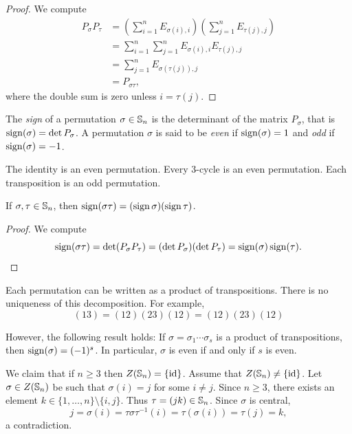 \begin{proof}
We compute 
\begin{align*}
P_\sigma P_\tau &=\left(\sum_{i=1}^n E_{\sigma(i),i}\right)\left(\sum_{j=1}^nE_{\tau{(j)},j}\right)\\
&=\sum_{i=1}^n\sum_{j=1}^n E_{\sigma(i),i}E_{\tau(j),j}\\
&=\sum_{j=1}^n E_{\sigma(\tau(j)),j}\\
&=P_{\sigma\tau},
\end{align*}
where the double sum is zero unless $i=\tau(j)$.
\end{proof}


\begin{definition}
    The \emph{sign} of a permutation $\sigma\in\mathbb{S}_n$ 
    is the 
    determinant of the matrix 
    $P_\sigma$, that is $\operatorname{sign}(\sigma)=\det P_\sigma$.
    A permutation $\sigma$ is said to be \emph{even} if $\operatorname{sign}(\sigma)=1$ and \emph{odd} if $\operatorname{sign}(\sigma)=-1$.
\end{definition}

The identity is an even permutation. Every 3-cycle is
an even permutation. Each transposition is an odd permutation. 

\begin{proposition}
If $\sigma,\tau\in\mathbb{S}_n$, then $\operatorname{sign}(\sigma\tau)=(\operatorname{sign}\sigma)(\operatorname{sign}\tau)$.
\end{proposition}

\begin{proof}
        We compute 
        \[
        \operatorname{sign}(\sigma\tau)=\det(P_\sigma P_\tau)=(\det P_\sigma)(\det P_\tau)=\operatorname{sign}(\sigma)\operatorname{sign}(\tau).\qedhere
        \]
\end{proof}

Each permutation can be written as a product of transpositions. 
There is no uniqueness of this decomposition. For example, 
\[
(13)=(12)(23)(12)=(12)(23)(12)
\]

However, the following result holds: If 
$\sigma=\sigma_1\cdots\sigma_s$ is a product of transpositions, 
then $\operatorname{sign}(\sigma)=(-1)^s$.
In particular, $\sigma$ is even if and only if
$s$ is even. 


\begin{example}
We claim that if $n\geq3$ then $Z(\mathbb{S}_n)=\{\operatorname{id}\}$.
Assume that $Z(\mathbb{S}_n)\ne\{\operatorname{id}\}$. Let 
$\sigma\in Z(\mathbb{S}_n)$ be such that $\sigma(i)=j$ for some $i\ne j$. 
Since $n\geq3$, there exists an element $k\in\{1,\dots,n
\}\setminus\{i,j\}$. Thus 
$\tau=(jk)\in\mathbb{S}_n$. Since $\sigma$ is central, 
\[
j=\sigma(i)=\tau\sigma\tau^{-1}(i)=\tau(\sigma(i))=\tau(j)=k,
\]
a contradiction.
\end{example}

